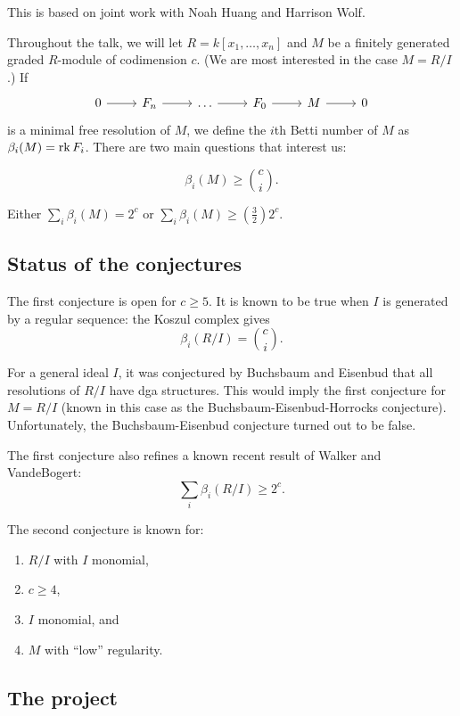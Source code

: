 \documentclass{amsart}
\begin{document}
This is based on joint work with Noah Huang and Harrison Wolf.

Throughout the talk, we will let $R = k[x_1, \dots, x_n]$ and $M$ be a finitely generated graded $R$-module of codimension $c$.
(We are most interested in the case $M = R / I$.)
If
\[
	\begin{tikzcd}
		0 \rar & F_n \rar & \dots \rar & F_0 \rar & M \rar & 0
	\end{tikzcd}
\]
is a minimal free resolution of $M$, we define the $i$th Betti number of $M$ as $\beta_i(M) = \operatorname{rk} F_i$.
There are two main questions that interest us:

\begin{conj}
	\[
		\beta_i(M) \geq \binom{c}{i}.
	\]
\end{conj}

\begin{conj}
	Either $\sum_i \beta_i(M) = 2^c$ or $\sum_i \beta_i(M) \geq \left(\frac{3}{2}\right) 2^c$.
\end{conj}

\subsection{Status of the conjectures}

The first conjecture is open for $c \geq 5$.
It is known to be true when $I$ is generated by a regular sequence: the Koszul complex gives 
\[
	\beta_i(R / I) = \binom{c}{i}.
\]

For a general ideal $I$, it was conjectured by Buchsbaum and Eisenbud that all resolutions of $R / I$ have dga structures.
This would imply the first conjecture for $M = R / I$ (known in this case as the Buchsbaum-Eisenbud-Horrocks conjecture).
Unfortunately, the Buchsbaum-Eisenbud conjecture turned out to be false.

The first conjecture also refines a known recent result of Walker and VandeBogert:
\[
	\sum_i \beta_i(R / I) \geq 2^c.
\]

The second conjecture is known for:
\begin{enumerate}
	\item $R / I$ with $I$ monomial,
	\item $c \geq 4$,
	\item $I$ monomial, and
	\item $M$ with ``low'' regularity.
\end{enumerate}

\subsection{The project}
\end{document}
